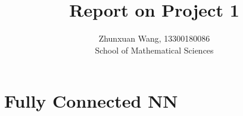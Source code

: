 \documentclass[10pt]{article}
\begin{document}
 
 
\title{\textbf{Report on Project 1}}%
\author{Zhunxuan Wang, 13300180086\\ %
School of Mathematical Sciences} %

\maketitle
\section{Fully Connected NN}
\end{document}
